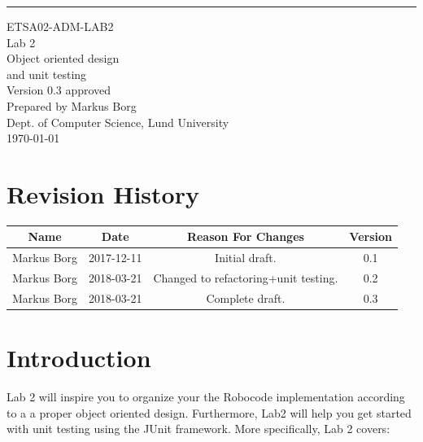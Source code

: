 \documentclass{scrreprt}
\date{}
\def\myversion{0.3 }
\begin{document}
\begin{flushright}
    \rule{16cm}{5pt}\vskip1cm
    \begin{bfseries}
    	\LARGE{ETSA02-ADM-LAB2}\\
    	\vspace{1.5cm}
        \Huge{Lab 2}\\
        \vspace{0.5cm}
        Object oriented design\\
        \vspace{0.5cm}
        and unit testing\\
        \vspace{1.5cm}
        \LARGE{Version \myversion approved}\\
        \vspace{1.5cm}
        Prepared by Markus Borg\\
        Dept. of Computer Science, Lund University\\
        \vspace{1.5cm}
        \today\\
    \end{bfseries}
\end{flushright}


\chapter*{Revision History}

\begin{center}
    \begin{tabular}{|c|c|c|c|}
        \hline
	    Name & Date & Reason For Changes & Version\\
        \hline
	    Markus Borg & 2017-12-11 & Initial draft. & 0.1\\
        \hline
        Markus Borg & 2018-03-21 & Changed to refactoring+unit testing. & 0.2\\
        \hline
        Markus Borg & 2018-03-21 & Complete draft. & 0.3\\
        \hline
    \end{tabular}
\end{center}

\chapter{Introduction}
Lab 2 will inspire you to organize your the Robocode implementation according to a a proper object oriented design. Furthermore, Lab2 will help you get started with unit testing using the JUnit framework. More specifically, Lab 2 covers:
\end{document}
